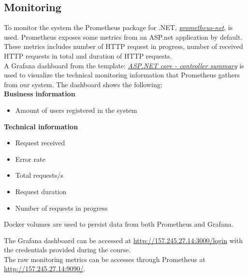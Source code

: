 \subsection{Monitoring}
To monitor the system the Prometheus package for .NET, \href{https://github.com/prometheus-net/prometheus-net}{\textit{prometheus-net}}, is used. Prometheus exposes some metrics from an ASP.net application by default. These metrics includes number of HTTP request in progress, number of received HTTP requests in total and duration of HTTP requests.
\\
A Grafana dashboard from the template: \href{https://grafana.com/grafana/dashboards/10915}{\textit{ASP.NET core - controller summary}} is used to visualize the technical monitoring information that Prometheus gathers from our system. The dashboard shows the following: \\
\noindent
\textbf{Business information}
\begin{itemize}
    \item Amount of users registered in the system
\end{itemize}
\textbf{Technical information}
\begin{itemize}
    \item Request received
    \item Error rate
    \item Total requests/s
    \item Request duration
    \item Number of requests in progress
\end{itemize}

Docker volumes are used to persist data from both Prometheus and Grafana.


The Grafana dashboard can be accessed at \href{http://157.245.27.14:3000/login}{http://157.245.27.14:3000/login} with the credentials provided during the course. \\
The raw monitoring metrics can be accesses through Prometheus at \href{http://157.245.27.14:9090/graph?g0.expr=&g0.tab=1&g0.stacked=0&g0.show_exemplars=0&g0.range_input=1h}{http://157.245.27.14:9090/}.


